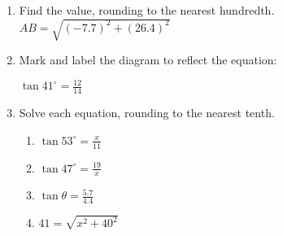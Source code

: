 \documentclass[12pt, twoside]{article}
\begin{document}
\begin{enumerate}
\item Find the value, rounding to the nearest hundredth.\\[0.25cm]
$AB=\sqrt{(-7.7)^2+(26.4)^2}$
\vspace{2.5cm}

\item Mark and label the diagram to reflect the equation:
\begin{multicols*}{2}
  $\displaystyle \tan 41^\circ = \frac{12}{14}$\\
\end{multicols*}


\newpage
\item Solve each equation, rounding to the nearest tenth.
  \begin{enumerate}
  \item $\displaystyle \tan 53^\circ = \frac{x}{11}$ \vspace{5cm}
  \item $\displaystyle \tan 47^\circ = \frac{19}{x}$ \vspace{4cm}
  \item $\displaystyle \tan \theta = \frac{5.7}{4.4}$ \vspace{4cm}
  \item $41=\sqrt{x^2+40^2}$
\end{enumerate}  

\end{enumerate}
\end{document}
